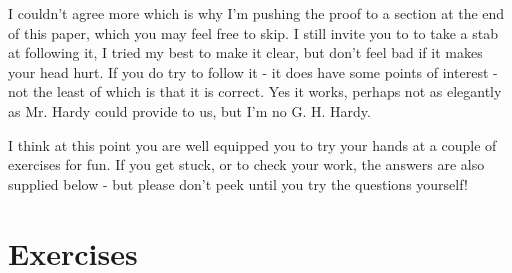 \documentclass{article}
\begin{document}
I couldn't agree more which is why I'm pushing the proof to a section at the end of this paper, which you may
feel free to skip.
I still invite you to to take a stab at following it, I tried my best to make it clear, but don't feel bad if it
makes your head hurt. If you do try to follow it - it does have some points of interest - not the least
of which is that it is correct.
Yes it works,  perhaps not as elegantly as Mr. Hardy could provide to us, but I'm no G. H. Hardy.

I think at this point you are well equipped you to try your hands at a couple of exercises for fun. If you get stuck, or to
check your work, the
answers are also supplied below - but please don't peek until you try the questions yourself!

\section*{Exercises}
\end{document}
